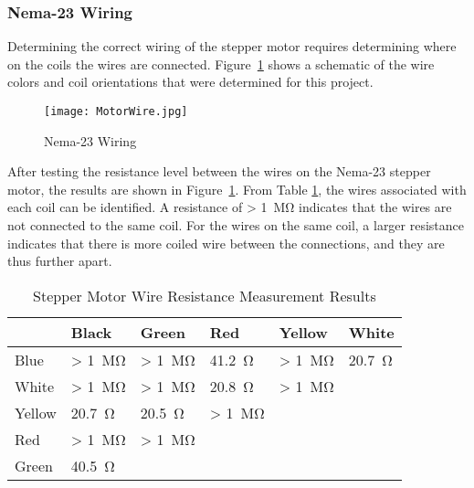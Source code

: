 \subsubsection{Nema-23 Wiring}

Determining the correct wiring of the stepper motor requires determining where on the coils the wires are connected. Figure~\ref{fig:motorWire} shows a schematic of the wire colors and coil orientations that were determined for this project.

\begin{figure}[H]
	\begin{center}
		\texttt{[image: MotorWire.jpg]}
		\caption{Nema-23 Wiring}
		\label{fig:motorWire}
	\end{center}
\end{figure}

After testing the resistance level between the wires on the Nema-23 stepper motor, the results are shown in Figure~\ref{tab:nemaTest}. From Table \ref{tab:nemaTest}, the wires associated with each coil can be identified. A resistance of > \SI{1}{\mega\ohm} indicates that the wires are not connected to the same coil. For the wires on the same coil, a larger resistance indicates that there is more coiled wire between the connections, and they are thus further apart.

\begin{table}[H]
	\renewcommand{\arraystretch}{\tablestretch}
	\centering
	\caption{Stepper Motor Wire Resistance Measurement Results}
	\begin{tabularx}{\textwidth}{X X X X X X  }
		\toprule
		& Black               & Green                 & Red                   & Yellow                & White                 \\
		\midrule
		Blue   & > \SI{1}{\mega\ohm} & > \SI{1}{\mega\ohm}   & \SI{41.2}{\ohm}       & > \SI{1}{\mega\ohm}   & \SI{20.7}{\ohm}       \\
		White  & > \SI{1}{\mega\ohm} & > \SI{1}{\mega\ohm}   & \SI{20.8}{\ohm}       & > \SI{1}{\mega\ohm}   & \cellcolor{lightgray} \\
		Yellow & \SI{20.7}{\ohm}     & \SI{20.5}{\ohm}       & > \SI{1}{\mega\ohm}   & \cellcolor{lightgray} & \cellcolor{lightgray} \\
		Red    & > \SI{1}{\mega\ohm} & > \SI{1}{\mega\ohm}   & \cellcolor{lightgray} & \cellcolor{lightgray} & \cellcolor{lightgray} \\
		Green  & \SI{40.5}{\ohm}     & \cellcolor{lightgray} & \cellcolor{lightgray} & \cellcolor{lightgray} & \cellcolor{lightgray} \\
		\bottomrule
	\end{tabularx}
	\label{tab:nemaTest}
\end{table}



